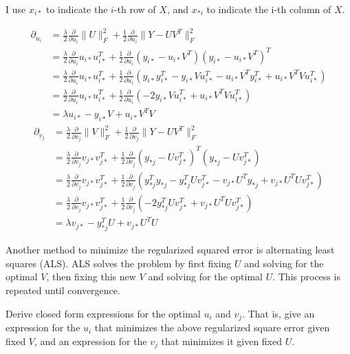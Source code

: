 \begin{solution}
	I use $x_{i*}$ to indicate the $i$-th row of $X$, and $x_{*i}$ to indicate the i-th column of $X$.

	\begin{align*}
		\partial_{u_i} &= \frac{\lambda}{2} \frac{\partial}{\partial u_i} \|U\|_F^2 + \frac{1}{2} \frac{\partial}{\partial u_i} \|Y - U V^T\|_F^2 \\
			&= \frac{\lambda}{2} \frac{\partial}{\partial u_i} u_{i*} u_{i*}^T + \frac{1}{2} \frac{\partial}{\partial u_i} (y_{i*} - u_{i*} V^T) (y_{i*} - u_{i*} V^T)^T \\
			&= \frac{\lambda}{2} \frac{\partial}{\partial u_i} u_{i*} u_{i*}^T + \frac{1}{2} \frac{\partial}{\partial u_i} (y_{i*} y_{i*}^T - y_{i*} V u_{i*}^T - u_{i*} V^T y_{i*}^T + u_{i*} V^T V u_{i*}^T) \\
			&= \frac{\lambda}{2} \frac{\partial}{\partial u_i} u_{i*} u_{i*}^T + \frac{1}{2} \frac{\partial}{\partial u_i} (-2 y_{i*} V u_{i*}^T + u_{i*} V^T V u_{i*}^T) \\
			&= \lambda u_{i*} - y_{i*} V + u_{i*} V^T V
	\end{align*}
	\begin{align*}
		\partial_{v_j} &= \frac{\lambda}{2} \frac{\partial}{\partial v_j} \|V\|_F^2 + \frac{1}{2} \frac{\partial}{\partial v_j} \|Y - U V^T\|_F^2 \\
			&= \frac{\lambda}{2} \frac{\partial}{\partial v_j} v_{j*} v_{j*}^T + \frac{1}{2} \frac{\partial}{\partial v_j} (y_{*j} - U v_{j*}^T)^T (y_{*j} - U v_{j*}^T) \\
			&= \frac{\lambda}{2} \frac{\partial}{\partial v_j} v_{j*} v_{j*}^T + \frac{1}{2} \frac{\partial}{\partial v_j} (y_{*j}^T y_{*j} - y_{*j}^T U v_{j*}^T - v_{j*} U^T y_{*j} + v_{j*} U^T U v_{j*}^T ) \\
			&= \frac{\lambda}{2} \frac{\partial}{\partial v_j} v_{j*} v_{j*}^T + \frac{1}{2} \frac{\partial}{\partial v_j} (-2 y_{*j}^T U v_{j*}^T + v_{j*} U^T U v_{j*}^T) \\
			&= \lambda v_{j*} - y_{*j}^T U + v_{j*} U^T U
	\end{align*}
\end{solution}

\problem[5]Another method to minimize the regularized squared error is alternating least squares (ALS). ALS solves the problem by first fixing $U$ and solving for the optimal $V$, then fixing this new $V$ and solving for the optimal $U$.  This process is repeated until convergence.

Derive closed form expressions for the optimal $u_i$ and $v_j$.  That is, give an expression for the $u_i$ that minimizes the above regularized square error given fixed $V$, and an expression for the $v_j$ that minimizes it given fixed $U$.

